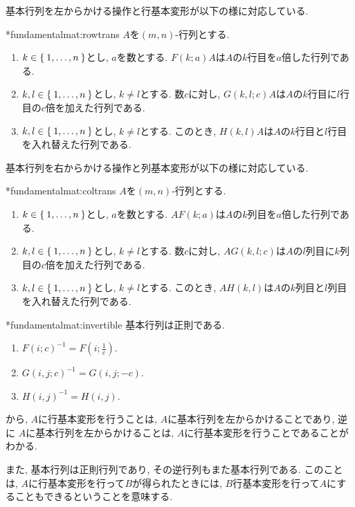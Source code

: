 基本行列を左からかける操作と行基本変形が以下の様に対応している.
\begin{lemma}
  \provelater**{fundamentalmat:rowtrans}
  \label{lem:fundamental}
  $A$を$(m,n)$-行列とする.
  \begin{enumerate}
  \item{}
    $k\in\Set{1,\ldots,n}$とし,
    $a$を数とする.
    $F(k;a)A$は$A$の$k$行目を$a$倍した行列である.
  \item{}
    $k,l\in\Set{1,\ldots,n}$とし,
    $k\neq l$とする.
    数$c$に対し,
    $G(k,l;c)A$は$A$の$k$行目に$l$行目の$c$倍を加えた行列である.
  \item{}
    $k,l\in\Set{1,\ldots,n}$とし,
    $k\neq l$とする.
    このとき, $H(k,l)A$は$A$の$k$行目と$l$行目を入れ替えた行列である.
  \end{enumerate}
\end{lemma}


基本行列を右からかける操作と列基本変形が以下の様に対応している.
\begin{lemma}
  \provelater**{fundamentalmat:coltrans}
  $A$を$(m,n)$-行列とする.
  \begin{enumerate}
  \item{}
    $k\in\Set{1,\ldots,n}$とし,
    $a$を数とする.
    $AF(k;a)$は$A$の$k$列目を$a$倍した行列である.
  \item{}
    $k,l\in\Set{1,\ldots,n}$とし,
    $k\neq l$とする.
    数$c$に対し,
    $AG(k,l;c)$は$A$の$l$列目に$k$列目の$c$倍を加えた行列である.
  \item{}
    $k,l\in\Set{1,\ldots,n}$とし,
    $k\neq l$とする.
    このとき, $AH(k,l)$は$A$の$k$列目と$l$列目を入れ替えた行列である.
  \end{enumerate}
\end{lemma}


\begin{prop}
  \provelater**{fundamentalmat:invertible}
  \label{lem:fund:is:invertible}
  基本行列は正則である.
  \begin{enumerate}
  \item{}
    $F(i;c)^{-1}=F(i;\frac{1}{c})$.
  \item{}
    $G(i,j;c)^{-1}=G(i,j;-c)$.
  \item{}
    $H(i,j)^{-1}=H(i,j)$.
  \end{enumerate}
\end{prop}


\begin{remark}
  から,
  $A$に行基本変形を行うことは,
  $A$に基本行列を左からかけることであり,
  逆に
  $A$に基本行列を左からかけることは,
  $A$に行基本変形を行うことであることがわかる.

  また, 基本行列は正則行列であり, その逆行列もまた基本行列である.
  このことは, $A$に行基本変形を行って$B$が得られたときには,
  $B$行基本変形を行って$A$にすることもできるということを意味する.
\end{remark}

